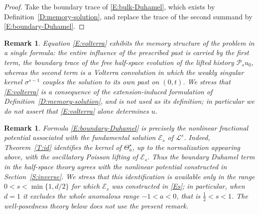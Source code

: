 \documentclass[11pt,letter]{amsart}
\numberwithin{equation}{section}
\newcommand{\Le}{\mathcal L}
\newtheorem{remark}[theorem]{Remark}
\numberwithin{equation}{section}
\begin{document}
\begin{proof}
Take the boundary trace of \eqref{E:bulk-Duhamel}, which exists by
Definition~\ref{D:memory-solution}, and replace the trace of the second
summand by \eqref{E:boundary-Duhamel}.

\end{proof}

\begin{remark}\label{R:volterra}
Equation \eqref{E:volterra} exhibits the memory structure of the problem in a
single formula: the entire influence of the prescribed past is carried by the
first term, the boundary trace of the free half-space evolution of the lifted
history $\mathcal P_su_0$, whereas the second term is a Volterra convolution in
which the weakly singular kernel $\sigma^{s-1}$ couples the solution
to its own past on $(0,t)$. We stress that \eqref{E:volterra} is a
\emph{consequence} of the extension-induced formulation of
Definition~\ref{D:memory-solution}, and is not used as its definition; in
particular we do not assert that \eqref{E:volterra} alone determines $u$.
\end{remark}

\begin{remark}\label{R:potential}
Formula \eqref{E:boundary-Duhamel} is precisely the nonlinear
fractional potential associated with the fundamental solution
\(\mathscr E_s\) of \(\Le^s\). Indeed, Theorem~\ref{T:id} identifies the
kernel of \(\Theta_a^\star\), up to the normalization appearing
above, with the oscillatory Poisson lifting of \(\mathscr E_s\). Thus the
boundary Duhamel term in the half-space theory agrees with the
nonlinear potential constructed in Section~\ref{S:inverse}. We stress that this
identification is available only in the range $0<s<\min\{1,d/2\}$ for which
$\mathscr E_s$ was constructed in \eqref{Es}; in particular, when $d=1$ it
excludes the whole anomalous range $-1<a<0$, that is $\frac12<s<1$. The
well-posedness theory below does not use the present remark.
\end{remark}
\end{document}

